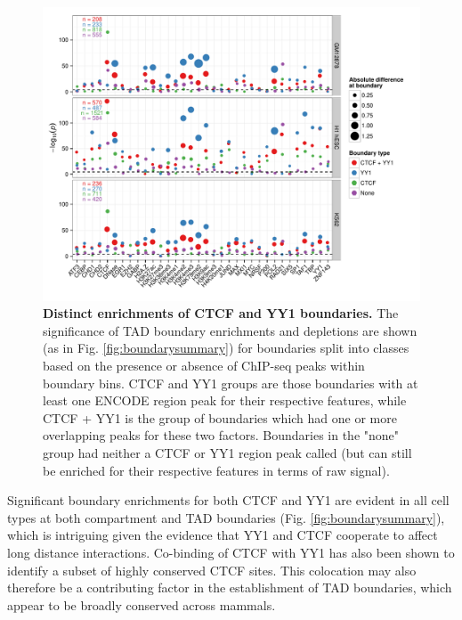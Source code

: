 \documentclass[a4paper,11pt,oneside]{book}
\begin{document}
\begin{figure}
\begin{center} 
\includegraphics[width=5.8in]{ctcfyy1.pdf}
\captionsetup{width=\textwidth}
\caption[Distinct enrichments of CTCF and YY1 boundaries.]{ {\bf Distinct enrichments of CTCF and YY1 boundaries.}
The significance of TAD boundary enrichments and depletions are shown (as in Fig. \ref{fig:boundarysummary}) for boundaries
split into classes based on the presence or absence of ChIP-seq peaks within boundary bins. CTCF and YY1 groups are
those boundaries with at least one ENCODE region peak\cite{Dunham2012} for
their respective features, while CTCF + YY1 is the group of boundaries which had one or more
overlapping peaks for these two factors. Boundaries in the "none" group had neither
a CTCF or YY1 region peak called (but can still
be enriched for their respective features in terms of raw signal). 
}\label{fig:ctcfyy1}
\end{center}
\end{figure} 

Significant boundary enrichments for both CTCF and YY1 are evident in all cell
types at both compartment and TAD boundaries (Fig. \ref{fig:boundarysummary}), which is intriguing given the evidence that YY1 and CTCF
cooperate to affect long distance interactions.\cite{Atchison2014} Co-binding of CTCF with YY1 has also been shown
to identify a subset of highly conserved CTCF sites.\cite{Schwalie2013} This colocation may also therefore be
a contributing factor in the establishment of TAD boundaries, which
appear to be broadly conserved across mammals.\cite{Dixon2012} 
\end{document}
